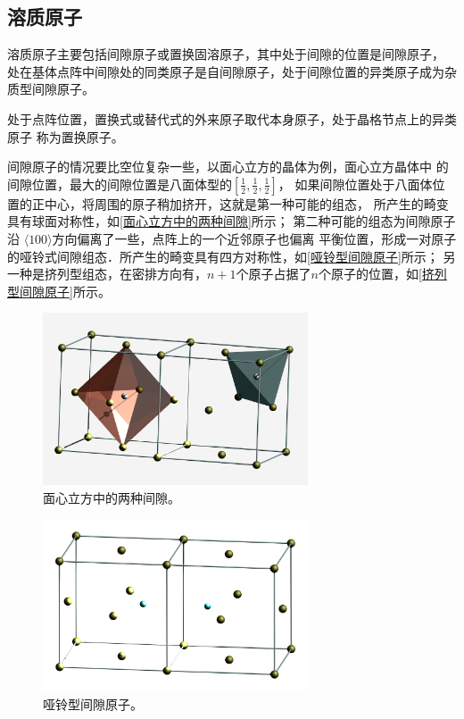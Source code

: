         \subsection{溶质原子}
            溶质原子主要包括间隙原子或置换固溶原子，其中处于间隙的位置是间隙原子，
            处在基体点阵中间隙处的同类原子是自间隙原子，处于间隙位置的异类原子成为杂质型间隙原子。

            处于点阵位置，置换式或替代式的外来原子取代本身原子，处于晶格节点上的异类原子
            称为置换原子。

            间隙原子的情况要比空位复杂一些，以面心立方的晶体为例，面心立方晶体中
            的间隙位置，最大的间隙位置是八面体型的$[\frac{1}{2},\frac{1}{2},\frac{1}{2}]$，
            如果间隙位置处于八面体位置的正中心，将周围的原子稍加挤开，这就是第一种可能的组态，
            所产生的畸变具有球面对称性，如\autoref{面心立方中的两种间隙}所示；
            第二种可能的组态为间隙原子沿 $\langle 100 \rangle$方向偏离了一些，点阵上的一个近邻原子也偏离
            平衡位置，形成一对原子的哑铃式间隙组态．所产生的畸变具有四方对称性，如\autoref{哑铃型间隙原子}所示；
            另一种是挤列型组态，在密排方向有，$n+1$个原子占据了$n$个原子的位置，如\autoref{挤列型间隙原子}所示。
            \begin{figure}[ht]
                \centering
                \includegraphics[width=0.7\textwidth]{fig/polyhedra_in_fcc.png}
                \caption{面心立方中的两种间隙。}
                \label{面心立方中的两种间隙}
            \end{figure}
            \begin{figure}[ht]
                \centering
                \includegraphics[width=0.7\textwidth]{fig/interstitial_in_fcc.png}
                \caption{哑铃型间隙原子。}
                \label{哑铃型间隙原子}
            \end{figure}
